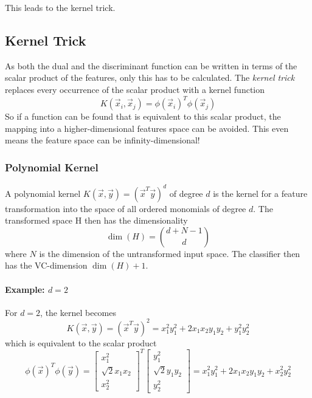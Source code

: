 				This leads to the kernel trick.

			\subsection{Kernel Trick}
				\label{sec:svmKernelTrick}

				As both the dual and the discriminant function can be written in terms of the scalar product of the features, only this has to be calculated. The \emph{kernel trick} replaces every occurrence of the scalar product with a kernel function
				\begin{equation}
					K(\vec{x}_i, \vec{x}_j) = \phi(\vec{x}_i)^T \phi(\vec{x}_j)
				\end{equation}
				So if a function can be found that is equivalent to this scalar product, the mapping into a higher-dimensional features space can be avoided. This even means the feature space can be infinity-dimensional!

				\subsubsection{Polynomial Kernel}
					A polynomial kernel \( K(\vec{x}, \vec{y}) = (\vec{x}^T \vec{y})^d \) of degree \(d\) is the kernel for a feature transformation into the space of all ordered monomials of degree \(d\). The transformed space H then has the dimensionality
					\begin{equation}
						\dim(H) = { d + N - 1 \choose d }
					\end{equation}
					where \(N\) is the dimension of the untransformed input space. The classifier then has the VC-dimension \( \dim(H) + 1 \).

					\paragraph{Example: \(d = 2\)}
						For \(d = 2\), the kernel becomes
						\begin{equation}
							K(\vec{x}, \vec{y}) = (\vec{x}^T \vec{y})^2 = x_1^2 y_1^2 + 2 x_1 x_2 y_1 y_2 + y_1^2 y_2^2
						\end{equation}
						which is equivalent to the scalar product
						\begin{equation}
							\phi(\vec{x})^T \phi(\vec{y}) =
							\begin{bmatrix}
								x_1^2            \\
								\sqrt{2} x_1 x_2 \\
								x_2^2
							\end{bmatrix}^T
							\begin{bmatrix}
								y_1^2            \\
								\sqrt{2} y_1 y_2 \\
								y_2^2
							\end{bmatrix}
							= x_1^2 y_1^2 + 2 x_1 x_2 y_1 y_2 + x_2^2 y_2^2
						\end{equation}

